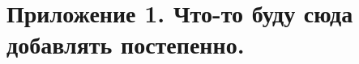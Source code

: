 
\chapter*{Приложение 1. Что-то буду сюда добавлять постепенно.}
\label{ch:appendix01}

\par\vspace{0.3cm}

\par\vspace{0.3cm}

